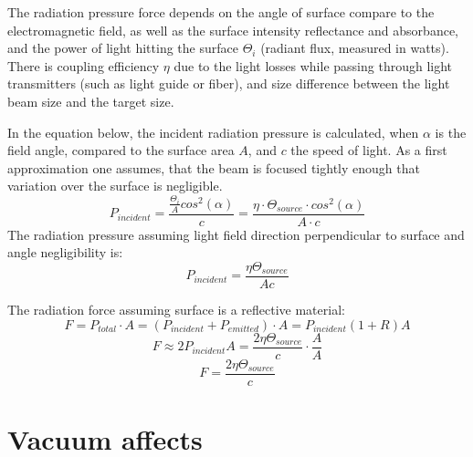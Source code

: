 \documentclass[\main/master.tex]{subfiles}
\begin{document}
\par\noindent
The radiation pressure force depends on the angle of surface compare to the electromagnetic field, as well as the surface intensity reflectance and absorbance, and the power of light hitting the surface $\Theta_i$ (radiant flux, measured in watts). There is coupling efficiency $\eta$ due to the light losses while passing through light transmitters (such as light guide or fiber), and size difference between the light beam size and the target size. 
\par\noindent
In the equation below, the incident radiation pressure is calculated, when $\alpha$ is the field angle, compared to the surface area $A$, and $c$ the speed of light. As a first approximation one assumes, that the beam is focused tightly enough that variation over the surface is negligible. 
\begin{equation}
P_{incident} = \frac{\frac{\Theta_i}{A}cos^2(\alpha)}{c} = \frac{\eta\cdot \Theta_{source}\cdot cos^2(\alpha)}{{A\cdot c}} \label{eqn:radiation_pressure}
\end{equation}
The radiation pressure assuming light field direction perpendicular to surface and angle negligibility is: 
\begin{equation}
P_{incident} = \frac{\eta\Theta_{source}}{{Ac}} \label{eqn:radiation_pressure_perpendicular}
\end{equation}
\par\noindent
The radiation force assuming surface is a reflective material:
\begin{equation}
F = P_{total}\cdot A = (P_{incident}+P_{emitted})\cdot A = P_{incident}(1+R)A \label{eqn:radiation_force}
\end{equation}
\begin{equation}
F \approx 2P_{incident}A = \frac{2\eta\Theta_{source}}{{c}}\cdot \frac{A}{A} \label{eqn:radiation_force_reflective}
\end{equation}
\begin{equation}
F = \frac{2\eta\Theta_{source}}{{c}} \label{eqn:radiation_force_power}
\end{equation}

\section{Vacuum affects}
\end{document}
